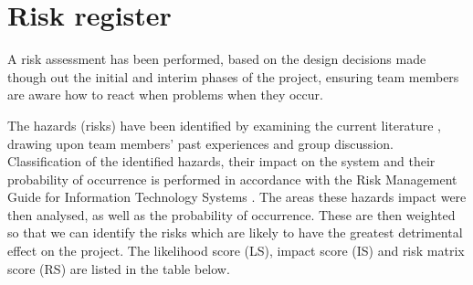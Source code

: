 \section{Risk register}
\label{sec:riskregister}

A risk assessment has been performed, based on the design decisions made though out the initial and interim phases of the project, ensuring team members are aware how to react when problems when they occur.

The hazards (risks) have been identified by examining the 
current literature \cite{boehm1991software,jones1998minimizing}, drawing upon team members' past experiences and group discussion. Classification of the identified hazards, their impact on the system and their probability of occurrence is performed in accordance with the Risk Management Guide for Information Technology Systems \cite{stoneburner2002risk}. The areas these hazards impact were then analysed, as well as the probability of occurrence. These are then weighted so that we can identify the risks which are likely to have the greatest detrimental effect on the project. The likelihood score (LS), impact score (IS) and risk matrix score (RS) are listed in the table below.

